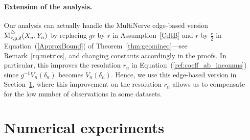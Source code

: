 \paragraph{Extension of the analysis.} 
Our analysis can actually handle the MultiNerve edge-based version $\overline{\mathrm{M}}^\triangle_{r,g,\delta}(X_n,Y_n)$ 
by replacing $gr$ by $r$ in Assumption~\eqref{CdtB} and $r$ by $\frac r2$ in Equation~(\ref{ApproxBound}) %
of Theorem~\ref{thm:geomineq}---see Remark~\ref{rq:metrics},
and changing constants accordingly in the proofs. In particular, this improves the resolution $r_n$ in Equation~(\ref{ref:coeff_ab_inconnus})
since $g^{-1}V_n(\delta_n)$ becomes $V_n(\delta_n)$. Hence, we use this edge-based version in Section~\ref{sec:appli},
where this improvement on the resolution $r_n$ allows us to compensate for the low number of observations in some datasets. 


























\section{Numerical experiments}\label{sec:appli}

